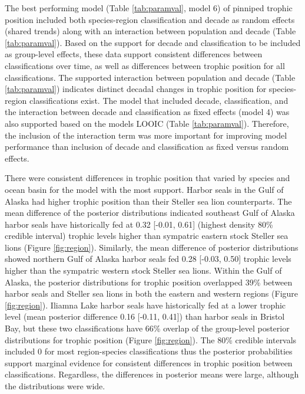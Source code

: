 \documentclass [11pt, proquest] {uwthesis}[2015/03/03]
\begin{document}
The best performing model (Table \ref{tab:paramval}, model 6) of
pinniped trophic position included both species-region classification
and decade as random effects (shared trends) along with an interaction
between population and decade (Table \ref{tab:paramval}). Based on the
support for decade and classification to be included as group-level
effects, these data support consistent differences between
classifications over time, as well as differences between trophic
position for all classifications. The supported interaction between
population and decade (Table \ref{tab:paramval}) indicates distinct
decadal changes in trophic position for species-region classifications
exist. The model that included decade, classification, and the
interaction between decade and classification as fixed effects (model 4)
was also supported based on the models LOOIC (Table \ref{tab:paramval}).
Therefore, the inclusion of the interaction term was more important for
improving model performance than inclusion of decade and classification
as fixed versus random effects.

There were consistent differences in trophic position that varied by
species and ocean basin for the model with the most support. Harbor
seals in the Gulf of Alaska had higher trophic position than their
Steller sea lion counterparts. The mean difference of the posterior
distributions indicated southeast Gulf of Alaska harbor seals have
historically fed at 0.32 {[}-0.01, 0.61{]} (highest density 80\%
credible interval) trophic levels higher than sympatric eastern stock
Steller sea lions (Figure \ref{fig:region}). Similarly, the mean
difference of posterior distributions showed northern Gulf of Alaska
harbor seals fed 0.28 {[}-0.03, 0.50{]} trophic levels higher than the
sympatric western stock Steller sea lions. Within the Gulf of Alaska,
the posterior distributions for trophic position overlapped 39\% between
harbor seals and Steller sea lions in both the eastern and western
regions (Figure \ref{fig:region}). Iliamna Lake harbor seals have
historically fed at a lower trophic level (mean posterior difference
0.16 {[}-0.11, 0.41{]}) than harbor seals in Bristol Bay, but these two
classifications have 66\% overlap of the group-level posterior
distributions for trophic position (Figure \ref{fig:region}). The 80\%
credible intervals included 0 for most region-species classifications
thus the posterior probabilities support marginal evidence for
consistent differences in trophic position between classifications.
Regardless, the differences in posterior means were large, although the
distributions were wide.
\end{document}

